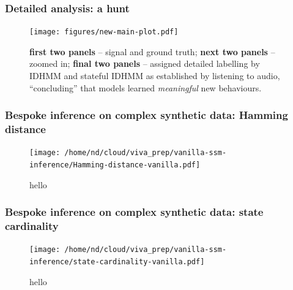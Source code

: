 \documentclass[aspectratio=169]{beamer}
\begin{document}
    \begin{frame}
        \frametitle{Detailed analysis: a hunt}
        \begin{figure}
            \texttt{[image: figures/new-main-plot.pdf]}
            \caption{{\bf first two panels} -- signal and ground truth; {\bf next two panels} -- zoomed in; {\bf final two panels} --  assigned detailed labelling by IDHMM and stateful IDHMM as established by listening to audio, ``concluding'' that models learned \emph{meaningful} new behaviours.}
        \end{figure}
    \end{frame}


\begin{frame}
        \frametitle{Bespoke inference on complex synthetic data: Hamming distance}
        \begin{figure}
            \texttt{[image: /home/nd/cloud/viva\_prep/vanilla-ssm-inference/Hamming-distance-vanilla.pdf]}
            \caption{hello}
        \end{figure}
\end{frame}

\begin{frame}
        \frametitle{Bespoke inference on complex synthetic data: state cardinality}
        \begin{figure}
            \texttt{[image: /home/nd/cloud/viva\_prep/vanilla-ssm-inference/state-cardinality-vanilla.pdf]}
            \caption{hello}
        \end{figure}
\end{frame}
\end{document}
